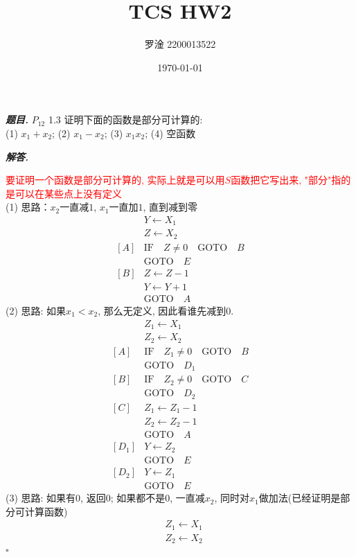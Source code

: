 \documentclass[10pt, a4paper, oneside]{ctexart}
\title{\textbf{TCS HW2}}
\author{罗淦 2200013522}
\date{\today}
\newenvironment{problem}{\begin{framed}\par\noindent\textbf{\textit{题目. }}}{\end{framed}\par}
\newenvironment{solution}{%
  \par\noindent\textbf{\textit{解答. }}\ignorespaces
}{%
  \hfill\ensuremath{\square}\par
}
\begin{document}
\maketitle

\begin{problem}
$P_{12}$ 1.3 证明下面的函数是部分可计算的:\\
(1) $x_1+x_2$;  (2) $x_1-x_2$;  (3) $x_1x_2$;  (4) 空函数
\end{problem}
\begin{solution}
\textcolor{red}{要证明一个函数是部分可计算的, 实际上就是可以用$S$函数把它写出来, "部分"指的是可以在某些点上没有定义}\\
(1) 思路：$x_2$一直减$1$, $x_1$一直加$1$, 直到减到零
\begin{align*}
    &Y\leftarrow X_1\\
    &Z\leftarrow X_2\\
    [A]& \text{IF} \quad Z\neq 0 \quad \text{GOTO} \quad B\\
    & \text{GOTO}\quad E\\
    [B]& Z\leftarrow Z-1\\
    &Y\leftarrow Y+1\\
    &\text{GOTO}\quad  A
\end{align*} 
(2) 思路: 如果$x_1<x_2$, 那么无定义, 因此看谁先减到$0$.
\begin{align*}
    &Z_1\leftarrow X_1\\
    &Z_2\leftarrow X_2\\
    [A]& \text{IF} \quad Z_1\neq 0 \quad \text{GOTO} \quad B\\
    &\text{GOTO}\quad  D_1\\
    [B]& \text{IF} \quad Z_2\neq 0 \quad \text{GOTO} \quad C\\
    &\text{GOTO}\quad  D_2\\
    [C]& Z_1\leftarrow Z_1-1\\
    & Z_2\leftarrow Z_2-1\\
    &\text{GOTO}\quad  A\\
    [D_1]& Y\leftarrow Z_2\\
    &\text{GOTO}\quad  E\\
    [D_2]& Y\leftarrow Z_1\\
    &\text{GOTO}\quad  E
\end{align*}
(3) 思路: 如果有$0$, 返回$0$; 如果都不是$0$, 一直减$x_2$, 同时对$x_1$做加法(已经证明是部分可计算函数)
\begin{align*}
    &Z_1\leftarrow X_1\\
    &Z_2\leftarrow X_2\\

\end{align*}
\end{solution}
\end{document}
